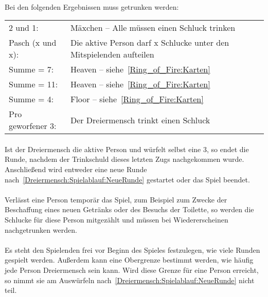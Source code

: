 \paragraph{}
Bei den folgenden Ergebnissen muss getrunken werden:

\begin{tabular}{p{8em} p{22em}}
	2 und 1:          & Mäxchen – Alle müssen einen Schluck trinken                         \\
	Pasch (x und x):  & Die aktive Person darf x Schlucke unter den Mitspielenden aufteilen \\
	Summe = 7:        & Heaven – siehe~\ref{Ring_of_Fire:Karten}                            \\
	Summe = 11:       & Heaven – siehe~\ref{Ring_of_Fire:Karten}                            \\
	Summe = 4:        & Floor – siehe~\ref{Ring_of_Fire:Karten}                             \\
	Pro geworfener 3: & Der Dreiermensch trinkt einen Schluck
\end{tabular}

\paragraph{}
Ist der Dreiermensch die aktive Person und würfelt selbst eine 3, so endet die Runde, nachdem der Trinkschuld dieses letzten Zugs nachgekommen wurde.
Anschließend wird entweder eine neue Runde nach~\ref{Dreiermensch:Spielablauf:NeueRunde} gestartet oder das Spiel beendet.

\paragraph{}
Verlässt eine Person temporär das Spiel, zum Beispiel zum Zwecke der Beschaffung eines neuen Getränks oder des Besuchs der Toilette, so werden die Schlucke für diese Person mitgezählt und müssen bei Wiedererscheinen nachgetrunken werden.

\paragraph{}
Es steht den Spielenden frei vor Beginn des Spieles festzulegen, wie viele Runden gespielt werden.
Außerdem kann eine Obergrenze bestimmt werden, wie häufig jede Person Dreiermensch sein kann.
Wird diese Grenze für eine Person erreicht, so nimmt sie am Auswürfeln nach~\ref{Dreiermensch:Spielablauf:NeueRunde} nicht teil.
